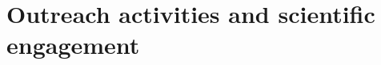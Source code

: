 \documentclass{mycv}
\begin{document}
\section{Outreach activities and scientific engagement}
\end{document}
